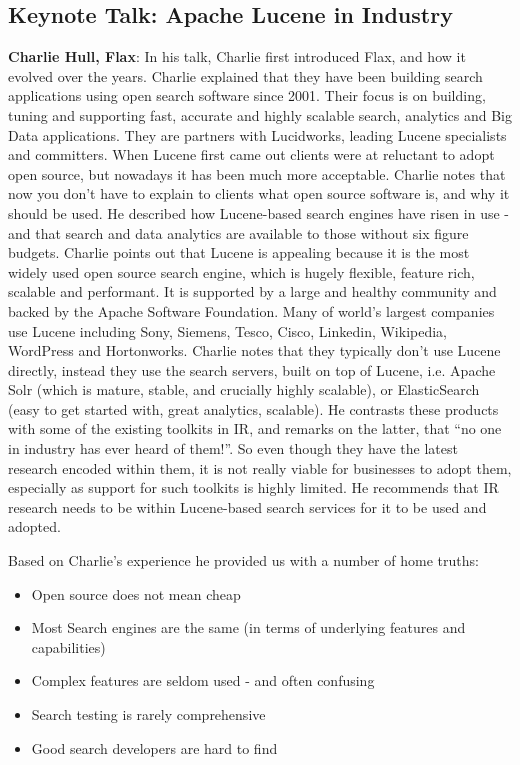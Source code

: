 \subsection*{Keynote Talk: Apache Lucene in Industry} 
{\bf Charlie Hull, Flax}: In his talk, Charlie first introduced Flax, and how it evolved over the years. Charlie explained that they have been building search applications using open search software since 2001. Their focus is on building, tuning and supporting fast, accurate and highly scalable search, analytics and Big Data applications. They are partners with Lucidworks, leading Lucene specialists and committers. When Lucene first came out clients were at reluctant to adopt open source, but nowadays it has been much more acceptable. Charlie notes that now you don't have to explain to clients what open source software is, and why it should be used. He described how Lucene-based search engines have risen in use - and that search and data analytics are available to those without six figure budgets. Charlie points out that Lucene is appealing because it is the most widely used open source search engine, which is hugely flexible, feature rich, scalable and performant. It is supported by a large and healthy community and backed by the Apache Software Foundation. Many of world's largest companies use Lucene including Sony, Siemens, Tesco, Cisco, Linkedin, Wikipedia, WordPress and Hortonworks. Charlie notes that they typically don't use Lucene directly, instead they use the search servers, built on top of Lucene, i.e. Apache Solr (which is mature, stable, and crucially highly scalable), or ElasticSearch (easy to get started with, great analytics, scalable). He contrasts these products with some of the existing toolkits in IR, and remarks on the latter, that ``no one in industry has ever heard of them!''. So even though they have the latest research encoded within them, it is not really viable for businesses to adopt them, especially as support for such toolkits is highly limited. He recommends that IR research needs to be within Lucene-based search services for it to be used and adopted. 


Based on Charlie's experience he provided us with a number of home truths:
\begin{itemize}
	\item Open source does not mean cheap 
	\item Most Search engines are the same (in terms of underlying features and capabilities)
	\item Complex features are seldom used - and often confusing
	\item Search testing is rarely comprehensive
	\item Good search developers are hard to find
\end{itemize}


